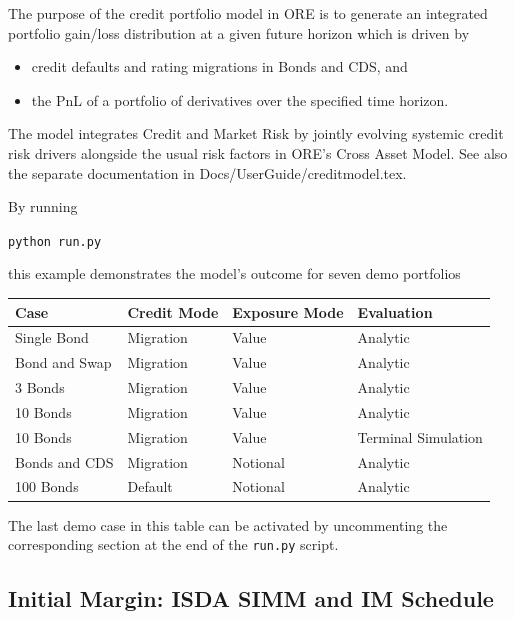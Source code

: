 The purpose of the credit portfolio model in ORE is to generate an integrated portfolio gain/loss distribution at a given future horizon which is driven by
\begin{itemize}
\item credit defaults and rating migrations in Bonds and CDS, and
\item the PnL of a portfolio of derivatives over the specified time horizon.
\end{itemize}
The model integrates Credit and Market Risk by jointly evolving systemic credit risk drivers alongside the usual risk factors in ORE's Cross Asset Model.
See also the separate documentation in Docs/UserGuide/creditmodel.tex.

By running \\
\medskip
\centerline{{\tt python run.py}}

\medskip
this example demonstrates the model's outcome for seven demo portfolios

\begin{center}
\begin{tabular}{|l|l|l|l|}
\hline
Case & Credit Mode & Exposure Mode & Evaluation \\
\hline
\hline
Single Bond & Migration & Value & Analytic \\
\hline
Bond and Swap & Migration & Value & Analytic \\
\hline
3 Bonds & Migration & Value & Analytic \\
\hline
10 Bonds & Migration & Value & Analytic \\
\hline
10 Bonds & Migration & Value & Terminal Simulation \\
\hline
Bonds and CDS & Migration & Notional & Analytic \\
\hline
100 Bonds & Default & Notional & Analytic \\
\hline
\end{tabular}
\end{center}
The last demo case in this table can be activated by uncommenting the corresponding section at the end of the {\tt run.py} script.

\subsection{Initial Margin: ISDA SIMM and IM Schedule}%
\label{example:44}

